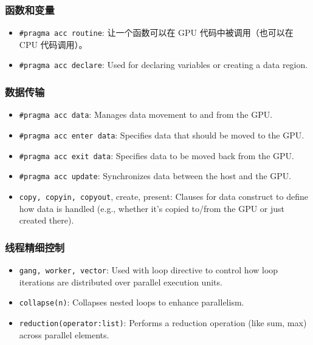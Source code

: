 \subsubsection{函数和变量}
\begin{itemize}
\item \verb`#pragma acc routine`: 让一个函数可以在 GPU 代码中被调用（也可以在 CPU 代码调用）。
\item \verb`#pragma acc declare`: Used for declaring variables or creating a data region.
\end{itemize}

\subsubsection{数据传输}
\begin{itemize}
\item \verb`#pragma acc data`: Manages data movement to and from the GPU.
\item \verb`#pragma acc enter data`: Specifies data that should be moved to the GPU.
\item \verb`#pragma acc exit data`: Specifies data to be moved back from the GPU.
\item \verb`#pragma acc update`: Synchronizes data between the host and the GPU.
\item \verb`copy, copyin, copyout`, create, present: Clauses for data construct to define how data is handled (e.g., whether it's copied to/from the GPU or just created there).
\end{itemize}

\subsubsection{线程精细控制}
\begin{itemize}
\item \verb`gang, worker, vector`: Used with loop directive to control how loop iterations are distributed over parallel execution units.
\item \verb`collapse(n)`: Collapses nested loops to enhance parallelism.
\item \verb`reduction(operator:list)`: Performs a reduction operation (like sum, max) across parallel elements.
\end{itemize}


